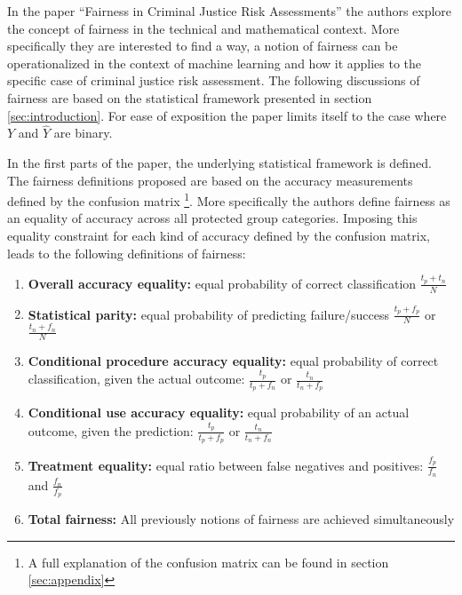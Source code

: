 In the paper \enquote{Fairness in Criminal Justice Risk Assessments} \cite{Berk.2018} 
the authors explore the concept of fairness in the technical and mathematical context. 
More specifically they are interested to find a way, a notion of fairness can be 
operationalized in the context of machine learning and how it applies to the specific
case of criminal justice risk assessment. The following discussions of fairness are based 
on the statistical framework presented in section \ref{sec:introduction}. For ease of 
exposition the paper limits itself to the case where $Y$ and $\hat{Y}$ are binary.


In the first parts of the paper, the underlying statistical framework is defined. The 
fairness definitions proposed are based on the accuracy measurements defined by the 
confusion matrix \footnote{A full explanation of the confusion matrix can be found in 
section \ref{sec:appendix}}. More specifically the authors define fairness as an equality 
of accuracy across all protected group categories. Imposing this equality constraint for 
each kind of accuracy defined by the confusion matrix, leads to the following definitions 
of fairness: 

\begin{enumerate}
    \item \textbf{Overall accuracy equality:} equal probability of correct classification 
    $\frac{t_p + t_n}{N}$ 
    \item \textbf{Statistical parity:} equal probability of predicting failure/success 
    $\frac{t_p + f_p}{N}$ or $\frac{t_n + f_n}{N}$
    \item \textbf{Conditional procedure accuracy equality:} equal probability of correct 
    classification, given the actual outcome: $\frac{t_p}{t_p + f_n}$ or 
    $\frac{t_n}{t_n + f_p}$
    \item \textbf{Conditional use accuracy equality:} equal probability of an actual 
    outcome, given the prediction: $\frac{t_p}{t_p + f_p}$ or $\frac{t_n}{t_n + f_n}$
    \item \textbf{Treatment equality:} equal ratio between false negatives and positives: 
    $\frac{f_p}{f_n}$ and $\frac{f_n}{f_p}$
    \item \textbf{Total fairness:} All previously notions of fairness are achieved 
    simultaneously
\end{enumerate}

